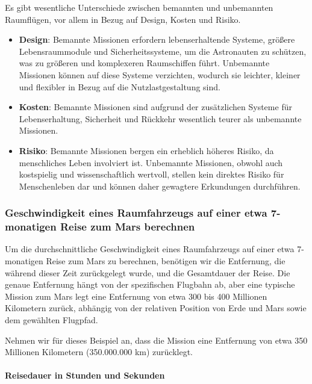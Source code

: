 \documentclass{vorlage-design-main}
\begin{document}
Es gibt wesentliche Unterschiede zwischen bemannten und unbemannten
Raumflügen, vor allem in Bezug auf Design, Kosten und Risiko.

\begin{itemize}

\item
  \textbf{Design}: Bemannte Missionen erfordern lebenserhaltende
  Systeme, größere Lebensraummodule und Sicherheitssysteme, um die
  Astronauten zu schützen, was zu größeren und komplexeren Raumschiffen
  führt. Unbemannte Missionen können auf diese Systeme verzichten,
  wodurch sie leichter, kleiner und flexibler in Bezug auf die
  Nutzlastgestaltung sind.
\item
  \textbf{Kosten}: Bemannte Missionen sind aufgrund der zusätzlichen
  Systeme für Lebenserhaltung, Sicherheit und Rückkehr wesentlich teurer
  als unbemannte Missionen.
\item
  \textbf{Risiko}: Bemannte Missionen bergen ein erheblich höheres
  Risiko, da menschliches Leben involviert ist. Unbemannte Missionen,
  obwohl auch kostspielig und wissenschaftlich wertvoll, stellen kein
  direktes Risiko für Menschenleben dar und können daher gewagtere
  Erkundungen durchführen.
\end{itemize}

\hypertarget{geschwindigkeit-eines-raumfahrzeugs-auf-einer-etwa-7-monatigen-reise-zum-mars-berechnen}{%
\subsubsection{Geschwindigkeit eines Raumfahrzeugs auf einer etwa
7-monatigen Reise zum Mars
berechnen}\label{geschwindigkeit-eines-raumfahrzeugs-auf-einer-etwa-7-monatigen-reise-zum-mars-berechnen}}

Um die durchschnittliche Geschwindigkeit eines Raumfahrzeugs auf einer
etwa 7-monatigen Reise zum Mars zu berechnen, benötigen wir die
Entfernung, die während dieser Zeit zurückgelegt wurde, und die
Gesamtdauer der Reise. Die genaue Entfernung hängt von der spezifischen
Flugbahn ab, aber eine typische Mission zum Mars legt eine Entfernung
von etwa 300 bis 400 Millionen Kilometern zurück, abhängig von der
relativen Position von Erde und Mars sowie dem gewählten Flugpfad.

Nehmen wir für dieses Beispiel an, dass die Mission eine Entfernung von
etwa 350 Millionen Kilometern (350.000.000 km) zurücklegt.

\hypertarget{reisedauer-in-stunden-und-sekunden}{%
\paragraph{Reisedauer in Stunden und
Sekunden}\label{reisedauer-in-stunden-und-sekunden}}
\end{document}
